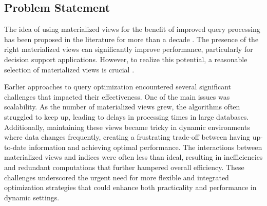 






\subsection{Problem Statement}
The idea of using materialized views for the benefit of improved query processing has been proposed in the literature for more than a decade \cite{Blakeley1986EfficientlyUM}. The presence of the right materialized views can significantly improve performance, particularly for decision support applications. However, to realize this potential, a reasonable selection of materialized views is crucial \cite{agrawal2000automated}.\vspace{.4cm}

Earlier approaches to query optimization encountered several significant challenges that impacted their effectiveness. One of the main issues was scalability. As the number of materialized views grew, the algorithms often struggled to keep up, leading to delays in processing times in large databases. Additionally, maintaining these views became tricky in dynamic environments where data changes frequently, creating a frustrating trade-off between having up-to-date information and achieving optimal performance. The interactions between materialized views and indices were often less than ideal, resulting in inefficiencies and redundant computations that further hampered overall efficiency. These challenges underscored the urgent need for more flexible and integrated optimization strategies that could enhance both practicality and performance in dynamic settings.\vspace{.4cm}

